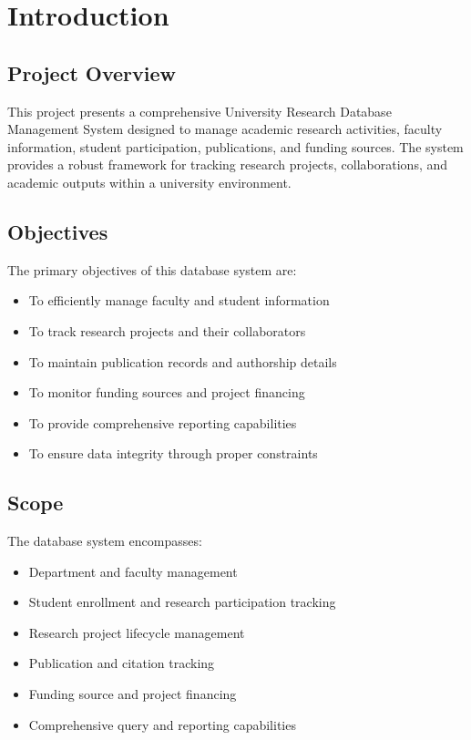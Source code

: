 \documentclass[12pt,a4paper]{article}
\begin{document}
\listoftables
\newpage

\section{Introduction}

\subsection{Project Overview}
This project presents a comprehensive University Research Database Management System designed to manage academic research activities, faculty information, student participation, publications, and funding sources. The system provides a robust framework for tracking research projects, collaborations, and academic outputs within a university environment.

\subsection{Objectives}
The primary objectives of this database system are:
\begin{itemize}
    \item To efficiently manage faculty and student information
    \item To track research projects and their collaborators
    \item To maintain publication records and authorship details
    \item To monitor funding sources and project financing
    \item To provide comprehensive reporting capabilities
    \item To ensure data integrity through proper constraints
\end{itemize}

\subsection{Scope}
The database system encompasses:
\begin{itemize}
    \item Department and faculty management
    \item Student enrollment and research participation tracking
    \item Research project lifecycle management
    \item Publication and citation tracking
    \item Funding source and project financing
    \item Comprehensive query and reporting capabilities
\end{itemize}
\end{document}
